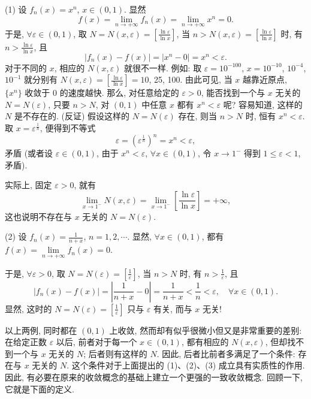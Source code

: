 \begin{example}\label{ex:13.1.8}
(1) 设 $f_{n}(x)=x^{n}$, $x\in(0,1)$. 显然
\[
  f(x)=\lim_{n\to+\infty}f_{n}(x)=\lim_{n\to+\infty}x^{n}=0.
\]
于是, $\forall\varepsilon\in(0,1)$, 取 $N=N(x,\varepsilon)=\left[\frac{\ln\varepsilon}{\ln x}\right]$, 当 $n>N(x,\varepsilon)=\left[\frac{\ln\varepsilon}{\ln x}\right]$ 时, 有 $n>\frac{\ln\varepsilon}{\ln x}$, 且
\[
  |f_{n}(x)-f(x)|=|x^{n}-0|=x^{n}<\varepsilon.
\]
对于不同的 $x$, 相应的 $N(x,\varepsilon)$ 就很不一样. 例如: 取 $\varepsilon=10^{-100}$, $x=10^{-10}$, $10^{-4}$, $10^{-1}$ 就分别有 $N(x,\varepsilon)=\left[\frac{\ln\varepsilon}{\ln x}\right]=10$, 25, 100. 由此可见, 当 $x$ 越靠近原点, $\{x^{n}\}$ 收敛于 $0$ 的速度越快. 那么, 对任意给定的 $\varepsilon>0$, 能否找到一个与 $x$ 无关的 $N=N(\varepsilon)$, 只要 $n>N$, 对 $(0,1)$ 中任意 $x$ 都有 $x^{n}<\varepsilon$ 呢? 容易知道, 这样的 $N$ 是不存在的. (反证) 假设这样的 $N=N(\varepsilon)$ 存在, 则当 $n>N$ 时, 恒有 $x^{n}<\varepsilon$. 取 $x=\varepsilon^{\frac{1}{n}}$, 便得到不等式
\[
  \varepsilon=(\varepsilon^{\frac{1}{n}})^{n}=x^{n}<\varepsilon,
\]
矛盾 (或者设 $\varepsilon\in(0,1)$, 由于 $x^{n}<\varepsilon$, $\forall x\in(0,1)$, 令 $x\to1^{-}$ 得到 $1\leqslant\varepsilon<1$, 矛盾).

实际上, 固定 $\varepsilon>0$, 就有
\[
  \lim_{x\to1^{-}}N(x,\varepsilon)=\lim_{x\to1^{-}}\left[\frac{\ln\varepsilon}{\ln x}\right]=+\infty,
\]
这也说明不存在与 $x$ 无关的 $N=N(\varepsilon)$.

(2) 设 $f_{n}(x)=\frac{1}{n+x}$, $n=1,2,\cdots$. 显然, $\forall x\in(0,1)$, 都有 $f(x)=\lim\limits_{n\to+\infty}f_{n}(x)=0$.
\end{example}

于是, $\forall\varepsilon>0$, 取 $N=N(\varepsilon)=\left[\frac{1}{\varepsilon}\right]$, 当 $n>N$ 时, 有 $n>\frac{1}{\varepsilon}$, 且
\[
  |f_{n}(x)-f(x)|=\left|\frac{1}{n+x}-0\right|=\frac{1}{n+x}<\frac{1}{n}<\varepsilon,\quad\forall x\in(0,1).
\]
显然, 这时的 $N=N(\varepsilon)=\left[\frac{1}{\varepsilon}\right]$ 只与 $\varepsilon$ 有关, 而与 $x$ 无关!

以上两例, 同时都在 $(0,1)$ 上收敛, 然而却有似乎很微小但又是非常重要的差别: 在给定正数 $\varepsilon$ 以后, 前者对于每一个 $x\in(0,1)$, 都有相应的 $N(x,\varepsilon)$, 但却找不到一个与 $x$ 无关的 $N$; 后者则有这样的 $N$. 因此, 后者比前者多满足了一个条件: 存在与 $x$ 无关的 $N$. 这个条件对于上面提出的 (1)、(2)、(3) 成立具有实质性的作用. 因此, 有必要在原来的收敛概念的基础上建立一个更强的一致收敛概念. 回顾一下, 它就是下面的定义.

